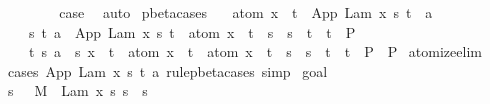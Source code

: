 \begin{isabellebody}
\ \ \ \ \isamarkupfalse%
\ {}\ \isamarkupfalse%
\ {\isacharquery}case\ \isamarkupfalse%
\ auto\isanewline
{}\isamarkupfalse%
%
\endisatagproof
{\isafoldproof}%
%
\isadelimproof
\isanewline
%
\endisadelimproof
\isanewline
{}\isamarkupfalse%
\ pbeta{\isacharunderscore}cases{\isacharunderscore}{}{\isacharcolon}\isanewline
\ \ \ {\isachardoublequoteopen}atom\ x\ {\isasymsharp}\ t\ {\isasymLongrightarrow}\ App\ {\isacharparenleft}Lam\ {\isacharbrackleft}x{\isacharbrackright}{\isachardot}\ s{\isacharparenright}\ t\ {\isasymggreater}\ a{}\ {\isasymLongrightarrow}\ \isanewline
\ \ \ \ {\isacharparenleft}{\isasymAnd}s{\isacharprime}\ t{\isacharprime}{\isachardot}\ a{}\ {\isacharequal}\ App\ {\isacharparenleft}Lam\ {\isacharbrackleft}x{\isacharbrackright}{\isachardot}\ s{\isacharprime}{\isacharparenright}\ t{\isacharprime}\ {\isasymLongrightarrow}\ atom\ x\ {\isasymsharp}\ t{\isacharprime}\ {\isasymLongrightarrow}\ s\ {\isasymggreater}\ s{\isacharprime}\ {\isasymLongrightarrow}\ t\ {\isasymggreater}\ t{\isacharprime}\ {\isasymLongrightarrow}\ P{\isacharparenright}\ {\isasymLongrightarrow}\isanewline
\ \ \ \ {\isacharparenleft}{\isasymAnd}t{\isacharprime}\ s{\isacharprime}{\isachardot}\ a{}\ {\isacharequal}\ s{\isacharprime}\ {\isacharbrackleft}x\ {\isacharcolon}{\isacharcolon}{\isacharequal}\ t{\isacharprime}{\isacharbrackright}\ {\isasymLongrightarrow}\ atom\ x\ {\isasymsharp}\ t\ {\isasymLongrightarrow}\ atom\ x\ {\isasymsharp}\ t{\isacharprime}\ {\isasymLongrightarrow}\ s\ {\isasymggreater}\ s{\isacharprime}\ {\isasymLongrightarrow}\ t\ {\isasymggreater}\ t{\isacharprime}\ {\isasymLongrightarrow}\ P{\isacharparenright}\ {\isasymLongrightarrow}\ P{\isachardoublequoteclose}\isanewline
%
\isadelimproof
%
\endisadelimproof
%
\isatagproof
{}\isamarkupfalse%
\ atomize{\isacharunderscore}elim\isanewline
{}\isamarkupfalse%
\ {\isacharparenleft}cases\ {\isachardoublequoteopen}App\ {\isacharparenleft}Lam\ {\isacharbrackleft}x{\isacharbrackright}{\isachardot}\ s{\isacharparenright}\ t{\isachardoublequoteclose}\ a{}\ rule{\isacharcolon}pbeta{\isachardot}cases{\isacharcomma}\ simp{\isacharparenright}\isanewline
{}\isamarkupfalse%
\ goal{}\ \isanewline
\ \ \isamarkupfalse%
\ \isamarkupfalse%
\ s{\isacharprime}{\isacharprime}\ \ {}{\isacharcolon}\ {\isachardoublequoteopen}M{\isacharprime}\ {\isacharequal}\ Lam\ {\isacharbrackleft}x{\isacharbrackright}{\isachardot}\ s{\isacharprime}{\isacharprime}{\isachardoublequoteclose}\ {\isachardoublequoteopen}s\ {\isasymggreater}\ s{\isacharprime}{\isacharprime}{\isachardoublequoteclose}\ \isamarkupfalse%

\end{isabellebody}

